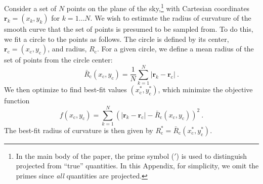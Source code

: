 \documentclass[useAMS, usenatbib, a4paper]{mnras}
\newcommand\C{\ensuremath{\mathrm{c}}}
\providecommand{\abs}[1]{\lvert#1\rvert}
\providecommand{\Abs}[1]{\left\lvert#1\right\rvert}
\begin{document}
Consider a set of \(N\) points on the plane of the sky,\footnote{%
  In the main body of the paper, the prime symbol (\('\)) is used to
  distinguish projected from ``true'' quantities.  In this Appendix,
  for simplicity, we omit the primes since \emph{all} quantities are
  projected.} %
with Cartesian coordinates \(\bm{r}_k = (x_k, y_k)\) for
\(k = 1 \dots N\).  We wish to estimate the radius of curvature of the
smooth curve that the set of points is presumed to be sampled from.
To do this, we fit a circle to the points as follows.  The circle is
defined by its center, \(\bm{r}_{\C} = (x_{\C}, y_{\C})\), and radius,
\(R_{\C}\).  For a given circle, we define a mean radius of the set of
points from the circle center:
\begin{equation}
  \label{eq:rcurv-mean-radius}
  \bar{R}_\C(x_{\C}, y_{\C}) = \frac{1}{N}  \sum_{k = 1}^{N} \Abs{\bm{r}_k - \bm{r}_{\C}}  \ .
\end{equation}
We then optimize
to find best-fit values \((x_{\C}^*, y_{\C}^*)\), which minimize the
objective function
\begin{equation}
  \label{eq:rcurv-objective-function}
  f(x_{\C}, y_{\C}) = \sum_{k = 1}^{N} \left(
    \abs{\bm{r}_k - \bm{r}_{\C}}  - \bar{R}_\C (x_{\C}, y_{\C}) \right)^2 \ .
\end{equation}
The best-fit radius of curvature is then given by
\(R_{\C}^* = \bar{R}_\C(x_{\C}^*, y_{\C}^*)\).
\end{document}
